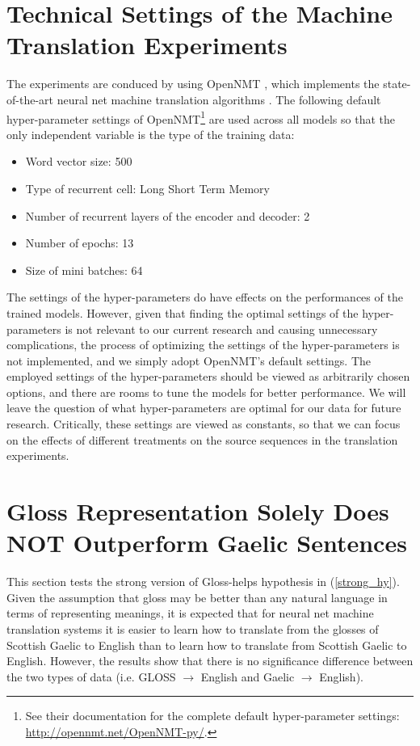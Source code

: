 \documentclass[11pt,a4paper]{article}
\begin{document}
\section{Technical Settings of the Machine Translation Experiments}\label{sec:experimet_setting}
The experiments are conduced by using OpenNMT \citep{2017opennmt}, which implements the state-of-the-art neural net machine translation algorithms \citep{cho2014properties, cho2014learning, bahdanau2014neural}.
The following default hyper-parameter settings of OpenNMT\footnote{See their documentation for the complete default hyper-parameter settings: \url{http://opennmt.net/OpenNMT-py/}.} are used across all models so that the only independent variable is the type of the training data:
	\begin{itemize}
	\item Word vector size: 500
	\item Type of recurrent cell: Long Short Term Memory
	\item Number of recurrent layers of the encoder and decoder: 2
	\item Number of epochs: 13
	\item Size of mini batches: 64\\
	\end{itemize}

The settings of the hyper-parameters do have effects on the performances of the trained models.
However, given that finding the optimal settings of the hyper-parameters is not relevant to our current research and causing unnecessary complications, the process of optimizing the settings of the hyper-parameters is not implemented, and we simply adopt OpenNMT's default settings. The employed settings of the hyper-parameters should be viewed as arbitrarily chosen options, and there are rooms to tune the models for better performance. We will leave the question of what hyper-parameters are optimal for our data for future research. Critically, these settings are viewed as constants, so that we can focus on the effects of different treatments on the source sequences in the translation experiments.

\section{Gloss Representation Solely Does NOT Outperform Gaelic Sentences} \label{gd_to_gl_to_en}
This section tests the strong version of Gloss-helps hypothesis in (\ref{strong_hy}).
Given the assumption that gloss may be better than any natural language in terms of representing meanings, it is expected that for neural net machine translation systems it is easier to learn how to translate from the glosses of Scottish Gaelic to English than to learn how to translate from Scottish Gaelic to English. However, the results show that there is no significance difference between the two types of data (i.e. GLOSS $\rightarrow$ English and Gaelic $\rightarrow$ English).
\end{document}
